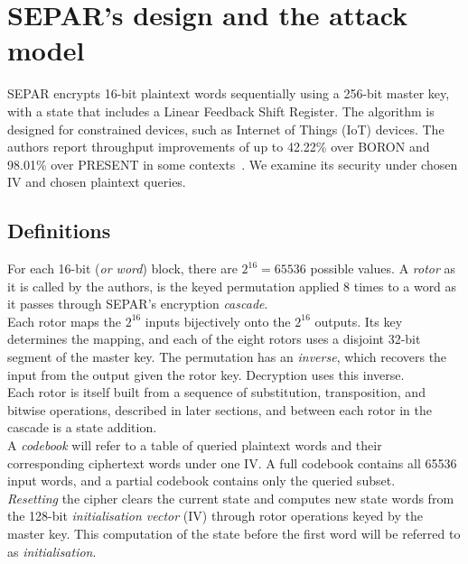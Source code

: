 \documentclass[11pt]{article}
\begin{document}
\newpage 

\section{SEPAR's design and the attack model}\label{sec:model}
SEPAR encrypts 16-bit plaintext words sequentially using a 256-bit master key, with a state that includes a Linear Feedback Shift Register. The algorithm is designed for constrained devices, such as Internet of Things (IoT) devices. The authors report throughput improvements of up to 42.22\% over BORON and 98.01\% over PRESENT in some contexts~\cite{separ}. We examine its security under chosen IV and chosen plaintext queries.

\subsection{Definitions}\label{definitions}
For each 16-bit (\textit{or word}) block, there are \(2^{16}=65536\) possible values.
A \emph{rotor} as it is called by the authors, is the keyed permutation applied 8 times to a word as it passes through
SEPAR's encryption \emph{cascade}.\\

Each rotor maps the $2^{16}$ inputs bijectively onto the $2^{16}$ outputs.
Its key determines the mapping, and each of the eight rotors uses a
disjoint 32-bit segment of the master key.
The permutation has
an \emph{inverse}, which recovers the input from the output given the
rotor key. Decryption uses this inverse.\\

Each rotor is itself built from a sequence of
substitution, transposition, and bitwise operations, described in later sections, and between each rotor in the cascade is a state addition.\\

A \emph{codebook}
will refer to a table of queried plaintext words and their corresponding
ciphertext words under one IV. A full codebook contains all 65536
input words, and a partial codebook contains only the queried subset.\\

\textit{Resetting} the cipher clears the current state and computes new state words from the
128-bit \emph{initialisation vector} (IV) through rotor operations keyed by the master key.
This computation of the state before the first word will be referred to as \emph{initialisation}.\\
\end{document}
